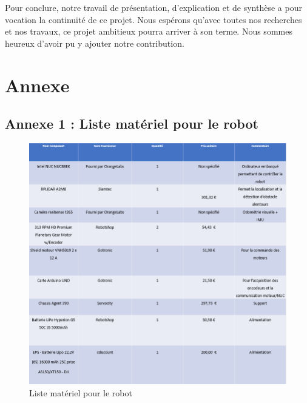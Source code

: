 \documentclass[french]{rapportENSTAB}
\begin{document}
Pour conclure, notre travail de présentation, d'explication et de synthèse a pour vocation la continuité de ce projet. Nous espérons qu'avec toutes nos recherches et nos travaux, ce projet ambitieux pourra arriver à son terme. Nous sommes heureux d'avoir pu y ajouter notre contribution.

\pagebreak
\listoffigures

\pagebreak
\section{Annexe}
\subsection{Annexe 1 : Liste matériel pour le robot}

\begin{figure}[H]
     \centering
     \includegraphics[scale=0.7]{images/robot/liste_composants_robot.png}
     \caption{Liste matériel pour le robot}
     \label{matos}
\end{figure}
\end{document}
